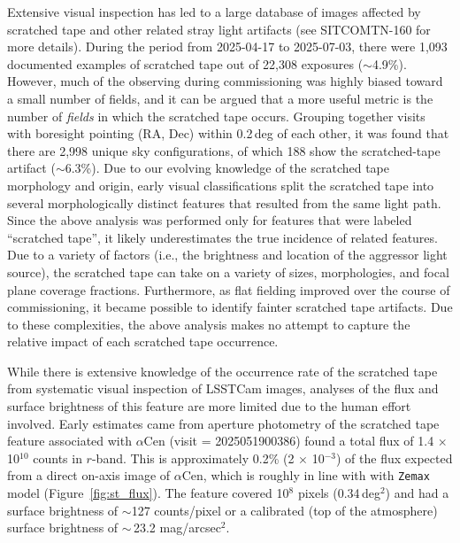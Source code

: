 \documentclass[SE,authoryear,toc]{lsstdoc}
\begin{document}
Extensive visual inspection has led to a large database of images affected by scratched tape and other related stray light artifacts (see SITCOMTN-160 for more details). During the period from 2025-04-17 to 2025-07-03, there were 1,093 documented examples of scratched tape out of 22,308 exposures ($\sim$4.9\%). However, much of the observing during commissioning was highly biased toward a small number of fields, and it can be argued that a more useful metric is the number of \emph{fields} in which the scratched tape occurs. Grouping together visits with boresight pointing (RA, Dec) within 0.2\,deg of each other, it was found that there are 2,998 unique sky configurations, of which 188 show the scratched-tape artifact ($\sim$6.3\%). Due to our evolving knowledge of the scratched tape morphology and origin, early visual classifications split the scratched tape into several morphologically distinct features that resulted from the same light path. Since the above analysis was performed only for features that were labeled ``scratched tape'', it likely underestimates the true incidence of related features. Due to a variety of factors (i.e., the brightness and location of the aggressor light source), the scratched tape can take on a variety of sizes, morphologies, and focal plane coverage fractions.  Furthermore, as flat fielding improved over the course of commissioning, it became possible to identify fainter scratched tape artifacts. Due to these complexities, the above analysis makes no attempt to capture the relative impact of each scratched tape occurrence.

While there is extensive knowledge of the occurrence rate of the scratched tape from systematic visual inspection of LSSTCam images, analyses of the flux and surface brightness of this feature are more limited due to the human effort involved. Early estimates came from aperture photometry of the scratched tape feature associated with $\alpha$Cen (visit = 2025051900386) found a total flux of 1.4 $\times$ 10$^{10}$ counts in $r$-band. This is approximately 0.2\% (2 $\times$ 10$^{-3}$) of the flux expected from a direct on-axis image of $\alpha$Cen, which is roughly in line with with \texttt{Zemax} model (Figure~\ref{fig:st_flux}). The feature covered 10$^8$ pixels (0.34\,deg$^2$) and had a surface brightness of $\sim$127 counts/pixel or a calibrated (top of the atmosphere) surface brightness of $\sim$\,23.2 mag/arcsec$^2$.
\end{document}
